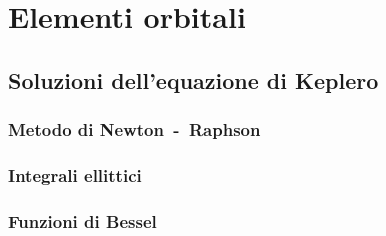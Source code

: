 \chapter{Elementi orbitali}
\label{chap:elementi-orbitali}

\section{Soluzioni dell'equazione di Keplero}
\label{sec:soluzioni}

\subsection{Metodo di Newton~-~Raphson}
\label{sec:newton}

\subsection{Integrali ellittici}
\label{sec:integrali-ellittici}

\subsection{Funzioni di Bessel}
\label{sec:bessel}

